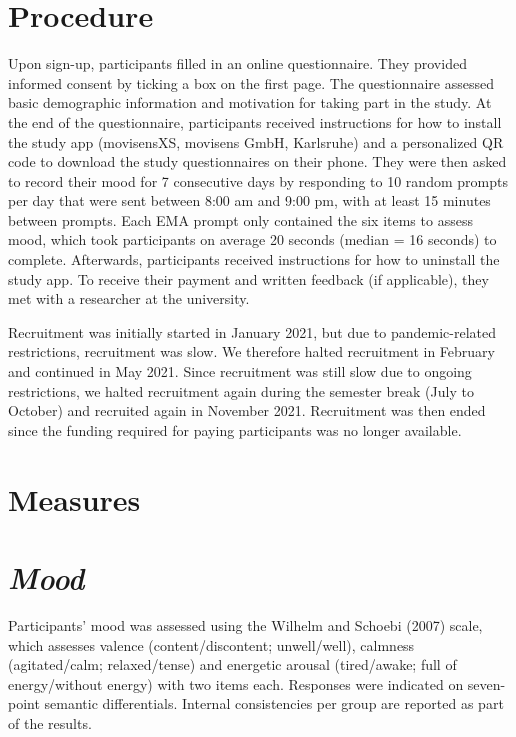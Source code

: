 \documentclass[authordate, empirical]{jote-new-article}
\begin{document}
	\section{\textbf{Procedure}}



	Upon sign-up, participants filled in an online questionnaire. They provided informed consent by ticking a box on the first page. The questionnaire assessed basic demographic information and motivation for taking part in the study. At the end of the questionnaire, participants received instructions for how to install the study app (movisensXS, movisens GmbH, Karlsruhe) and a personalized QR code to download the study questionnaires on their phone. They were then asked to record their mood for 7 consecutive days by responding to 10 random prompts per day that were sent between 8:00 am and 9:00 pm, with at least 15 minutes between prompts. Each EMA prompt only contained the six items to assess mood, which took participants on average 20 seconds (median = 16 seconds) to complete. Afterwards, participants received instructions for how to uninstall the study app. To receive their payment and written feedback (if applicable), they met with a researcher at the university.



	Recruitment was initially started in January 2021, but due to pandemic-related restrictions, recruitment was slow. We therefore halted recruitment in February and continued in May 2021. Since recruitment was still slow due to ongoing restrictions, we halted recruitment again during the semester break (July to October) and recruited again in November 2021. Recruitment was then ended since the funding required for paying participants was no longer available.



	\section{\textbf{Measures}}



	\section{\emph{\textbf{Mood}}}



	Participants' mood was assessed using the Wilhelm and Schoebi (2007) scale, which assesses valence (content/discontent; unwell/well), calmness (agitated/calm; relaxed/tense) and energetic arousal (tired/awake; full of energy/without energy) with two items each. Responses were indicated on seven-point semantic differentials. Internal consistencies per group are reported as part of the results.
\end{document}

